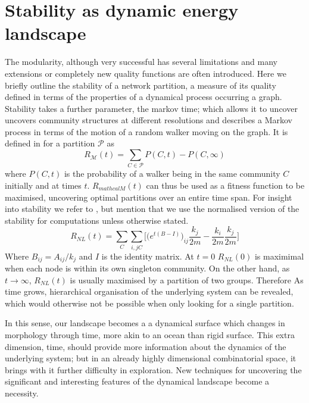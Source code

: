 \clearpage
\afterpage{\clearpage}

\section{Stability as dynamic energy landscape}
\label{sec:stabilityLandscape}

The modularity, although very successful has several limitations and many extensions or completely new quality functions are often introduced.  Here we briefly outline the stability of a network partition, a measure of its quality defined in terms of the properties of a dynamical process occurring a graph. Stability takes a further parameter, the markov time; which allows it to uncover uncovers community structures at different resolutions and describes a Markov process in terms of the motion of a random walker moving on the graph.  It is defined in \cite{Lambiotte2009} for a partition $\mathcal{P}$ as
\[
R_{\mathcal{M}}(t) = \sum_{C \in \mathcal{P}} P(C,t) − P(C, \infty )
\]
where $P(C, t)$ is the probability of a walker being in the same community $C$ initially and at times $t$.
$R_{mathcal{M}}(t)$ can thus be used as a fitness function to be maximised, uncovering optimal partitions over an entire time span.  For insight into stability we refer to \cite{Lambiotte2009}\cite{Delvenne2010a}, but mention that we use the normalised version of the stability for computations unless otherwise stated.
\[ 
R_{NL}(t) = \sum_C\sum_{i,j C}\bigg[\Big( e^{t(B-I)} \Big)_{ij}  \frac{k_j}{2m}-\frac{k_i}{2m}\frac{k_j}{2m}\bigg]
\]
Where $B_{ij} = A_{ij}/k_j$ and $I$ is the identity matrix.
At $t = 0$ $R_{NL}(0)$ is maximimal when each node is within its own singleton community. On the other hand, as $t \rightarrow \infty$, $R_{NL}(t)$ is usually maximised by a partition of two groups.  Therefore As time grows, hierarchical organisation of the underlying system can be revealed, which would otherwise not be possible when only looking for a single partition.

In this sense, our landscape becomes a a dynamical surface which changes in morphology through time, more akin to an ocean than rigid surface.  This extra dimension, time, should provide more information about the dynamics of the underlying system; but in an already highly dimensional combinatorial space, it brings with it further difficulty in exploration.  New techniques for uncovering the significant and interesting features of the dynamical landscape become a necessity.

